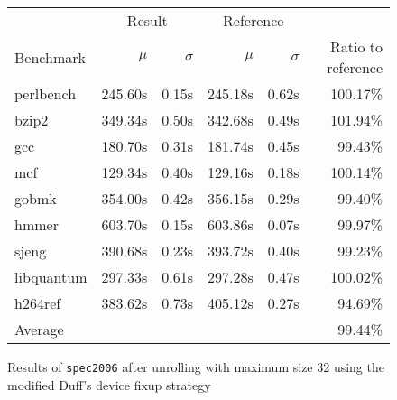 \begin{figure}[th]
    \begin{center}
        \begin{tabular}{lrrrrr}
            \toprule
            & \multicolumn{2}{c}{Result} & \multicolumn{2}{c}{Reference}\\
            Benchmark & $\mu$ & $\sigma$ & $\mu$ & $\sigma$ & Ratio to reference\\
            \midrule
            perlbench & 245.60s & 0.15s & 245.18s & 0.62s & 100.17\%\\
            bzip2 & 349.34s & 0.50s & 342.68s & 0.49s & 101.94\%\\
            gcc & 180.70s & 0.31s & 181.74s & 0.45s & 99.43\%\\
            mcf & 129.34s & 0.40s & 129.16s & 0.18s & 100.14\%\\
            gobmk & 354.00s & 0.42s & 356.15s & 0.29s & 99.40\%\\
            hmmer & 603.70s & 0.15s & 603.86s & 0.07s & 99.97\%\\
            sjeng & 390.68s & 0.23s & 393.72s & 0.40s & 99.23\%\\
            libquantum & 297.33s & 0.61s & 297.28s & 0.47s & 100.02\%\\
            h264ref & 383.62s & 0.73s & 405.12s & 0.27s & 94.69\%\\
            \midrule
            Average & & & & & 99.44\%\\
            \bottomrule
        \end{tabular}
    \end{center}
    \caption{Results of \texttt{spec2006} after unrolling with maximum size 32 using the modified Duff's device fixup strategy}
    \label{fig:eval:perf:duff:32}
\end{figure}

